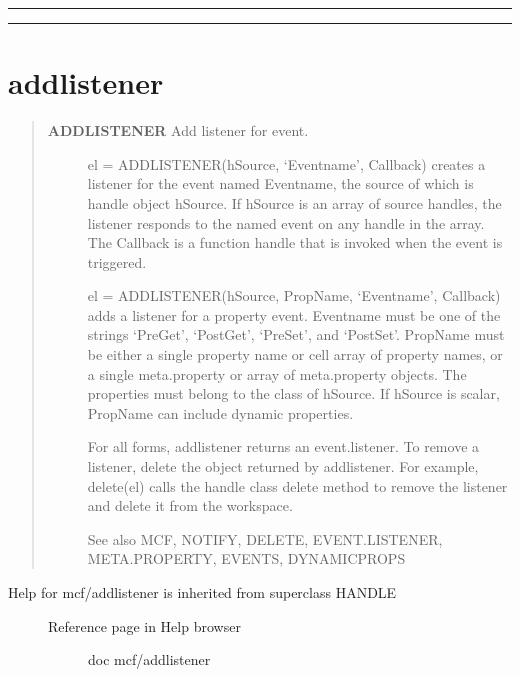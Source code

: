 \documentclass[letterpaper,10pt,english]{sphinxmanual}
\begin{document}
\bigskip\hrule{}\bigskip



\bigskip\hrule{}\bigskip



\section{addlistener}
\label{classes/utils/@mcf/mcf:addlistener}\label{classes/utils/@mcf/mcf:id3}\begin{quote}
\begin{description}
\item[{\textbf{ADDLISTENER}   Add listener for event.}] \leavevmode
el = ADDLISTENER(hSource, `Eventname', Callback) creates a listener
for the event named Eventname, the source of which is handle object
hSource.  If hSource is an array of source handles, the listener
responds to the named event on any handle in the array.  The Callback
is a function handle that is invoked when the event is triggered.

el = ADDLISTENER(hSource, PropName, `Eventname', Callback) adds a
listener for a property event.  Eventname must be one of the strings
`PreGet', `PostGet', `PreSet', and `PostSet'.  PropName must be either
a single property name or cell array of property names, or a single
meta.property or array of meta.property objects.  The properties must
belong to the class of hSource.  If hSource is scalar, PropName can
include dynamic properties.

For all forms, addlistener returns an event.listener.  To remove a
listener, delete the object returned by addlistener.  For example,
delete(el) calls the handle class delete method to remove the listener
and delete it from the workspace.

See also MCF, NOTIFY, DELETE, EVENT.LISTENER, META.PROPERTY, EVENTS,
DYNAMICPROPS

\end{description}
\end{quote}
\begin{description}
\item[{Help for mcf/addlistener is inherited from superclass HANDLE}] \leavevmode\begin{description}
\item[{Reference page in Help browser}] \leavevmode
doc mcf/addlistener

\end{description}

\end{description}
\end{document}

